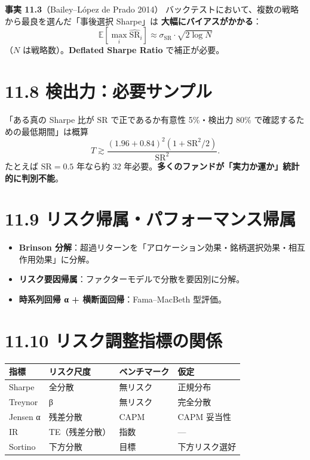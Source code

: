 \documentclass[11pt,a4paper]{report}
\begin{document}
\textbf{事実 11.3}（Bailey–López de Prado 2014） バックテストにおいて、複数の戦略から最良を選んだ「事後選択 Sharpe」は \textbf{大幅にバイアスがかかる}： \[ \mathbb{E}[\max_i \widehat{\mathrm{SR}}_i] \approx \sigma_{\mathrm{SR}} \cdot \sqrt{2\log N} \] （$N$ は戦略数）。\textbf{Deflated Sharpe Ratio} で補正が必要。

\section{11.8 検出力：必要サンプル}

「ある真の Sharpe 比が $\mathrm{SR}$ で正であるか有意性 5\%・検出力 80\% で確認するための最低期間」は概算 \[ T \gtrsim \frac{(1.96 + 0.84)^2 (1 + \mathrm{SR}^2/2)}{\mathrm{SR}^2}. \] たとえば $\mathrm{SR} = 0.5$ 年なら約 32 年必要。\textbf{多くのファンドが「実力か運か」統計的に判別不能}。

\section{11.9 リスク帰属・パフォーマンス帰属}

\begin{itemize}
\item \textbf{Brinson 分解}：超過リターンを「アロケーション効果・銘柄選択効果・相互作用効果」に分解。
\item \textbf{リスク要因帰属}：ファクターモデルで分散を要因別に分解。
\item \textbf{時系列回帰 α + 横断面回帰}：Fama–MacBeth 型評価。
\end{itemize}

\section{11.10 リスク調整指標の関係}

\begin{center}
\begin{tabular}{|l|l|l|l|}
\hline
指標 & リスク尺度 & ベンチマーク & 仮定 \\ \hline
Sharpe & 全分散 & 無リスク & 正規分布 \\ \hline
Treynor & β & 無リスク & 完全分散 \\ \hline
Jensen α & 残差分散 & CAPM & CAPM 妥当性 \\ \hline
IR & TE（残差分散） & 指数 & — \\ \hline
Sortino & 下方分散 & 目標 & 下方リスク選好 \\ \hline
\end{tabular}
\end{center}
\end{document}
